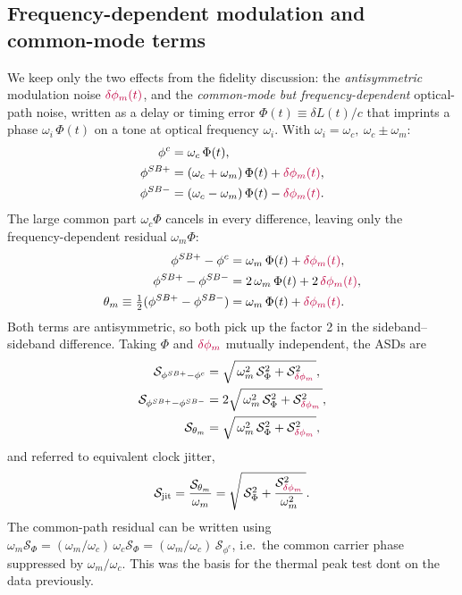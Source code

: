 \documentclass[11pt]{article}
\begin{document}
\subsection*{Frequency-dependent modulation and common-mode terms}

We keep only the two effects from the fidelity discussion: the
\emph{antisymmetric} modulation noise ${\color{purple}\delta\phi_{m}(t)}$, and the \emph{common-mode but
frequency-dependent} optical-path noise, written as a delay or timing error
$\Phi(t)\equiv\delta L(t)/c$ that imprints a phase $\omega_i\,\Phi(t)$ on a tone
at optical frequency $\omega_i$. With $\omega_i = \omega_c,\ \omega_c\pm\omega_m$:
%
\begin{align*}
    \phi^{c}   &= \omega_c\,\Phi(t),\\
    \phi^{SB+} &= (\omega_c+\omega_m)\,\Phi(t) + {\color{purple}\delta\phi_{m}(t)},\\
    \phi^{SB-} &= (\omega_c-\omega_m)\,\Phi(t) - {\color{purple}\delta\phi_{m}(t)}.
\end{align*}
%
The large common part $\omega_c\Phi$ cancels in every difference, leaving only
the frequency-dependent residual $\omega_m\Phi$:
%
\begin{align*}
    \phi^{SB+}-\phi^{c}   &= \omega_m\,\Phi(t) + {\color{purple}\delta\phi_{m}(t)},\\
    \phi^{SB+}-\phi^{SB-} &= 2\,\omega_m\,\Phi(t) + 2\,{\color{purple}\delta\phi_{m}(t)},\\
    \theta_m \equiv \tfrac12(\phi^{SB+}-\phi^{SB-}) &= \omega_m\,\Phi(t) + {\color{purple}\delta\phi_{m}(t)}.
\end{align*}
%
Both terms are antisymmetric, so both pick up the factor 2 in the sideband--sideband difference. Taking $\Phi$ and ${\color{purple}\delta\phi_m}$ mutually independent, the ASDs are
%
\begin{align*}
    \mathcal{S}_{\phi^{SB+}-\phi^{c}}
      &= \sqrt{\,\omega_m^{2}\,\mathcal{S}_{\Phi}^{2}
        + \mathcal{S}_{{\color{purple}\delta\phi_{m}}}^{2}\,},\\
    \mathcal{S}_{\phi^{SB+}-\phi^{SB-}}
      &= 2\sqrt{\,\omega_m^{2}\,\mathcal{S}_{\Phi}^{2}
        + \mathcal{S}_{{\color{purple}\delta\phi_{m}}}^{2}\,},\\
    \mathcal{S}_{\theta_m}
      &= \sqrt{\,\omega_m^{2}\,\mathcal{S}_{\Phi}^{2}
        + \mathcal{S}_{{\color{purple}\delta\phi_{m}}}^{2}\,},
\end{align*}
%
and referred to equivalent clock jitter,
%
\begin{equation*}
    \mathcal{S}_{\mathrm{jit}}
    = \frac{\mathcal{S}_{\theta_m}}{\omega_m}
    = \sqrt{\,\mathcal{S}_{\Phi}^{2}
      + \frac{\mathcal{S}_{{\color{purple}\delta\phi_{m}}}^{2}}{\omega_m^{2}}\,}.
\end{equation*}
%
The common-path residual can be written using $\omega_m\mathcal{S}_{\Phi} = (\omega_m/\omega_c)\,\omega_c\mathcal{S}_{\Phi} = (\omega_m/\omega_c)\,\mathcal{S}_{\phi^{c}}$, i.e.\ the common carrier phase suppressed by $\omega_m/\omega_c$. This was the basis for the thermal peak test dont on the data previously.
\end{document}

